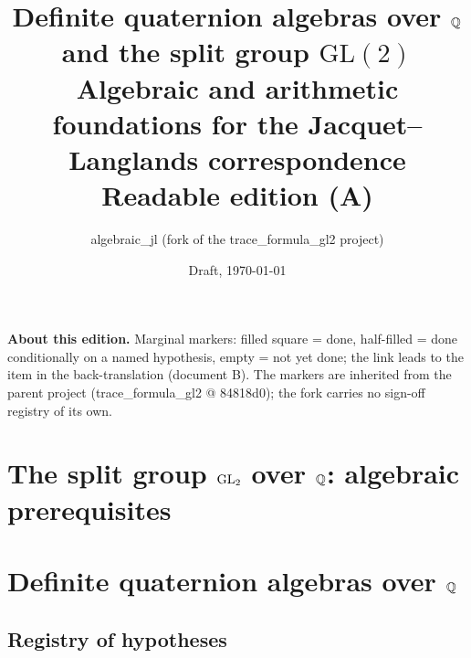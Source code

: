 \documentclass[11pt,twoside]{book}
\title{Definite quaternion algebras over $\mathbb{Q}$\\ and the split group $\mathrm{GL}(2)$\\[1ex]
  \large Algebraic and arithmetic foundations for the Jacquet--Langlands correspondence\\[1ex]\normalsize Readable edition (A)}
\author{algebraic\_jl (fork of the trace\_formula\_gl2 project)}
\date{Draft, \today}
\begin{document}
\frontmatter
\maketitle
\noindent\textbf{About this edition.} Marginal markers: filled square = done,
half-filled = done conditionally on a named hypothesis, empty = not yet done; the link leads to the item
in the back-translation (document B). The markers are inherited from the parent project
(trace\_formula\_gl2 @ 84818d0); the fork carries no sign-off registry of its own.
\par\medskip
\tableofcontents
\mainmatter



\part{The split group \texorpdfstring{$\mathrm{GL}_2$}{GL2} over \texorpdfstring{$\mathbb{Q}$}{Q}: algebraic prerequisites}
















\part{Definite quaternion algebras over \texorpdfstring{$\mathbb{Q}$}{Q}}




\appendix

\chapter{Registry of hypotheses}\label{ch:hypotheses}


\backmatter
\printbibliography
\end{document}
